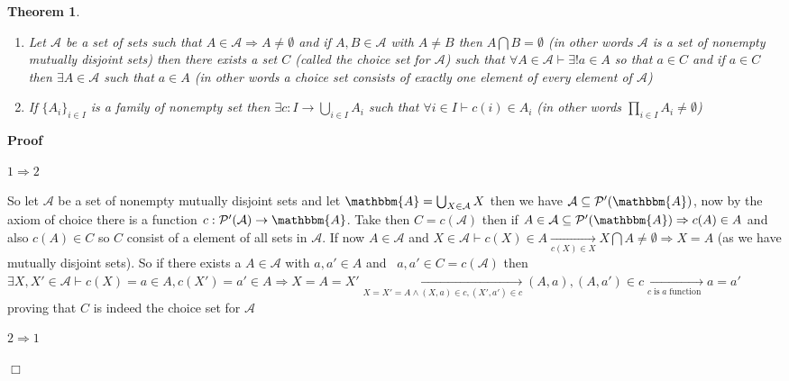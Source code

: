 \documentclass{book}
\newcommand{\Rightarrowlim}{\mathop{\rightarrow}\limits}
\newcommand{\tmop}[1]{\ensuremath{\operatorname{#1}}}
\newenvironment{proof}{\noindent\textbf{Proof\ }}{\hspace*{\fill}$\Box$\medskip}
\newtheorem{theorem}{Theorem}
\begin{document}
{{\begin{theorem}
\begin{enumerate}
    \item Let $\mathcal{A}$ be a set of sets such that $A \in \mathcal{A}
    \Rightarrow A \neq \emptyset$ and if $A, B \in \mathcal{A}$ with $A \neq
    B$ then $A \bigcap B = \emptyset$ (in other words $\mathcal{A}$ is a set
    of nonempty mutually disjoint sets) then there exists a set $C$ (called
    the choice set for $\mathcal{A}$) such that $\forall A \in \mathcal{A}
    \vdash \exists !a \in A$ so that $a \in C$ and if $a \in C$ then $\exists
    A \in \mathcal{A}$ such that $a \in A$ (in other words a choice set
    consists of exactly one element of every element of $\mathcal{A}$)
    
    \item If $\{ A_i \}_{i \in I}$ is a family of nonempty set then $\exists c
    : I \rightarrow \bigcup_{i \in I} A_i$ such that $\forall i \in I \vdash c
    (i) \in A_i$ (in other words $\prod_{i \in I} A_i \neq \emptyset$)
  \end{enumerate}
\end{theorem}

\begin{proof}
  
  
  $1 \Rightarrow 2$
  
  So let $\mathcal{A}$ be a set of nonempty mutually disjoint sets and let
  $\mathbbm{A}= \bigcup_{X \in \mathcal{A}} X$ then we have $\mathcal{A}
  \subseteq \mathcal{P}' (\mathbbm{A})$, now by the axiom of choice there is a
  function $c : \mathcal{P}' (\mathcal{A}) \rightarrow \mathbbm{A}$. Take then
  $C = c (\mathcal{A})$ then if $A \in \mathcal{A} \subseteq \mathcal{P}'
  (\mathbbm{A}) \Rightarrow c (A) \in A$ and also $c (A) \in C$ so $C$ consist
  of a element of all sets in $\mathcal{A}$. If now $A \in \mathcal{A}$ and $X
  \in \mathcal{A} \vdash c (X) \in A \Rightarrowlim_{c (X) \in X} X \bigcap A
  \neq \emptyset \Rightarrow X = A$ (as we have mutually disjoint sets). So if
  there exists a $A \in \mathcal{A}$ with $a, a' \in A$ and \ $a, a' \in C = c
  (\mathcal{A})$ then $\exists X, X' \in \mathcal{A} \vdash c (X) = a \in A, c
  (X') = a' \in A \Rightarrow X = A = X' \Rightarrowlim_{X = X' = A \wedge (X,
  a) \in c, (X', a') \in c} (A, a), (A, a') \in c \Rightarrowlim_{c \tmop{is}
  a \tmop{function}} a = a'$ proving that $C$ is indeed the choice set for
  $\mathcal{A}$ \ 
  
  $2 \Rightarrow 1$
  

\end{proof}}}
\end{document}

